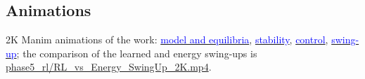 \documentclass[12pt,a4paper]{article}
\begin{document}
\subsection{Animations}
2K Manim animations of the work:
\href{https://drive.google.com/file/d/18Ic6QdsY37QBfvFIwmVA_8Z-u4AyNPdg/view?usp=sharing}{\textcolor{blue}{model and equilibria}},
\href{https://drive.google.com/file/d/19THfoXXzbdMtbteCKE4v0VRLpV869wE0/view?usp=sharing}{\textcolor{blue}{stability}},
\href{https://drive.google.com/file/d/1c-7Yy664ZP4TCJIeDbrAmFozHC8frao1/view?usp=sharing}{\textcolor{blue}{control}},
\href{https://drive.google.com/file/d/1jPQRn3W-bvUyvSKlHvYmX74bfPX9N16P/view?usp=sharing}{\textcolor{blue}{swing-up}};
the comparison of the learned and energy swing-ups is \url{phase5_rl/RL_vs_Energy_SwingUp_2K.mp4}.

\end{document}
